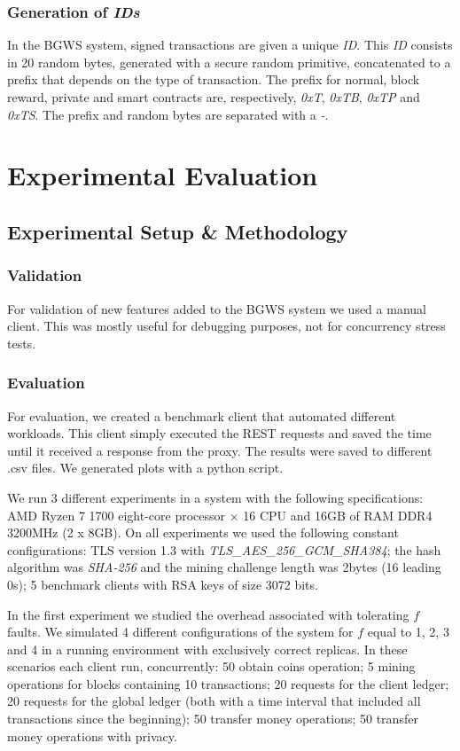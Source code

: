 \documentclass[10pt,journal,compsoc]{IEEEtran}
\begin{document}
	\subsubsection{Generation of \textit{IDs}}

    In the BGWS system, signed transactions are given a unique \textit{ID}. This \textit{ID} consists in 20 random bytes, generated with a secure random primitive, concatenated to a prefix that depends on the type of transaction. The prefix for normal, block reward, private and smart contracts are, respectively, \textit{0xT}, \textit{0xTB}, \textit{0xTP} and \textit{0xTS}. The prefix and random bytes are separated with a \textit{-}.


	\section{Experimental Evaluation}
	\subsection{Experimental Setup \& Methodology}
	\subsubsection{Validation}
	For validation of new features added to the BGWS system we used a manual client. This was mostly useful for debugging purposes, not for concurrency stress tests.
	
    \subsubsection{Evaluation}
	For evaluation, we created a benchmark client that automated different workloads. This client simply executed the REST requests and saved the time until it received a response from the proxy. The results were saved to different .csv files. We generated plots with a python script.
	
	We run 3 different experiments in a system with the following specifications: AMD Ryzen 7 1700 eight-core processor × 16 CPU and 16GB of RAM DDR4 3200MHz (2 x 8GB).
    On all experiments we used the following constant configurations: TLS version 1.3 with \textit{TLS\_AES\_256\_GCM\_SHA384}; the hash algorithm was \textit{SHA-256} and the mining challenge length was 2bytes (16 leading 0s);  5 benchmark clients with RSA keys of size 3072 bits.

	In the first experiment we studied the overhead associated with tolerating $f$ faults. We simulated 4 different configurations of the system for $f$ equal to 1, 2, 3 and 4 in a running environment with exclusively correct replicas. In these scenarios each client run, concurrently: 50 obtain coins operation; 5 mining operations for blocks containing 10 transactions; 20 requests for the client ledger; 20 requests for the global ledger (both with a time interval that included all transactions since the beginning); 50 transfer money operations; 50 transfer money operations with privacy. 
	
\end{document}
